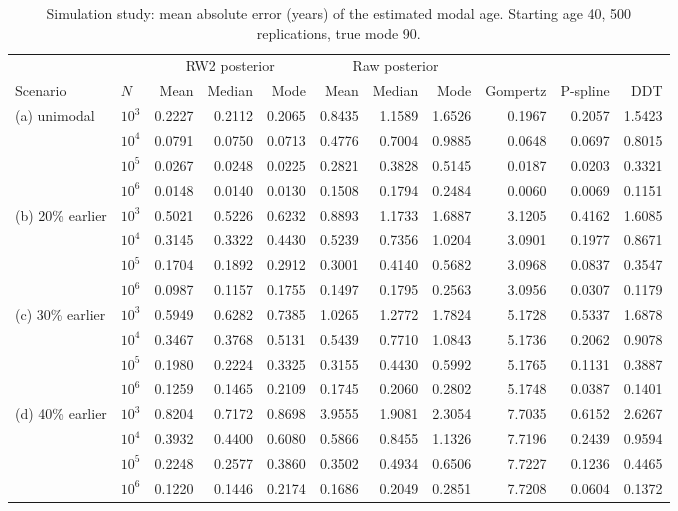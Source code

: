 \begin{table}[htb!]
\centering
\caption{Simulation study: mean absolute error (years) of the estimated modal age. Starting age 40, 500 replications, true mode 90.}
\label{tab:app_mae}
\scriptsize
\setlength{\tabcolsep}{4pt}
\begin{tabular}{llrrrrrrrrr}
\hline
 & & \multicolumn{3}{c}{RW2 posterior} & \multicolumn{3}{c}{Raw posterior} & & & \\
Scenario & $N$ & Mean & Median & Mode & Mean & Median & Mode & Gompertz & P-spline & DDT \\
\hline
(a) unimodal & $10^3$ & 0.2227 & 0.2112 & 0.2065 & 0.8435 & 1.1589 & 1.6526 & 0.1967 & 0.2057 & 1.5423 \\
 & $10^4$ & 0.0791 & 0.0750 & 0.0713 & 0.4776 & 0.7004 & 0.9885 & 0.0648 & 0.0697 & 0.8015 \\
 & $10^5$ & 0.0267 & 0.0248 & 0.0225 & 0.2821 & 0.3828 & 0.5145 & 0.0187 & 0.0203 & 0.3321 \\
 & $10^6$ & 0.0148 & 0.0140 & 0.0130 & 0.1508 & 0.1794 & 0.2484 & 0.0060 & 0.0069 & 0.1151 \\[2pt]
(b) 20\% earlier & $10^3$ & 0.5021 & 0.5226 & 0.6232 & 0.8893 & 1.1733 & 1.6887 & 3.1205 & 0.4162 & 1.6085 \\
 & $10^4$ & 0.3145 & 0.3322 & 0.4430 & 0.5239 & 0.7356 & 1.0204 & 3.0901 & 0.1977 & 0.8671 \\
 & $10^5$ & 0.1704 & 0.1892 & 0.2912 & 0.3001 & 0.4140 & 0.5682 & 3.0968 & 0.0837 & 0.3547 \\
 & $10^6$ & 0.0987 & 0.1157 & 0.1755 & 0.1497 & 0.1795 & 0.2563 & 3.0956 & 0.0307 & 0.1179 \\[2pt]
(c) 30\% earlier & $10^3$ & 0.5949 & 0.6282 & 0.7385 & 1.0265 & 1.2772 & 1.7824 & 5.1728 & 0.5337 & 1.6878 \\
 & $10^4$ & 0.3467 & 0.3768 & 0.5131 & 0.5439 & 0.7710 & 1.0843 & 5.1736 & 0.2062 & 0.9078 \\
 & $10^5$ & 0.1980 & 0.2224 & 0.3325 & 0.3155 & 0.4430 & 0.5992 & 5.1765 & 0.1131 & 0.3887 \\
 & $10^6$ & 0.1259 & 0.1465 & 0.2109 & 0.1745 & 0.2060 & 0.2802 & 5.1748 & 0.0387 & 0.1401 \\[2pt]
(d) 40\% earlier & $10^3$ & 0.8204 & 0.7172 & 0.8698 & 3.9555 & 1.9081 & 2.3054 & 7.7035 & 0.6152 & 2.6267 \\
 & $10^4$ & 0.3932 & 0.4400 & 0.6080 & 0.5866 & 0.8455 & 1.1326 & 7.7196 & 0.2439 & 0.9594 \\
 & $10^5$ & 0.2248 & 0.2577 & 0.3860 & 0.3502 & 0.4934 & 0.6506 & 7.7227 & 0.1236 & 0.4465 \\
 & $10^6$ & 0.1220 & 0.1446 & 0.2174 & 0.1686 & 0.2049 & 0.2851 & 7.7208 & 0.0604 & 0.1372 \\
\hline
\end{tabular}
\end{table}
